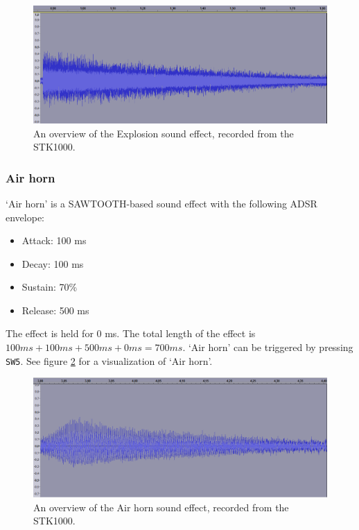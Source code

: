 \begin{figure}[H]
	\includegraphics[width = \textwidth]{images/SW6.png}
	\caption{An overview of the Explosion sound effect, recorded from the STK1000.}
	\label{img-sw6}
\end{figure}


\subsubsection{Air horn}
`Air horn' is a SAWTOOTH-based sound effect with the following ADSR envelope:
\begin{itemize}
	\item{Attack: 100 ms}
	\item{Decay: 100 ms}
	\item{Sustain: 70\%}
	\item{Release: 500 ms}
\end{itemize}
The effect is held for 0 ms.
The total length of the effect is $100 ms + 100 ms + 500 ms + 0 ms = 700 ms$.
`Air horn' can be triggered by pressing \texttt{SW5}.
See figure \ref{img-sw5} for a visualization of `Air horn'.

\begin{figure}[H]
	\includegraphics[width = \textwidth]{images/SW5.png}
	\caption{An overview of the Air horn sound effect, recorded from the STK1000.}
	\label{img-sw5}
\end{figure}


